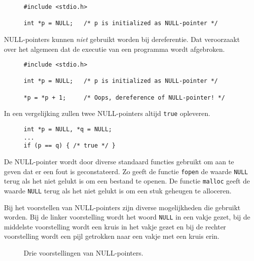 \begin{figure}[!ht]
\begin{lstlisting}[caption=Declaratie en initialisatie van een NULL-pointer.]
#include <stdio.h>

int *p = NULL;   /* p is initialized as NULL-pointer */
\end{lstlisting}
\end{figure}

NULL-pointers kunnen \textsl{niet} gebruikt worden bij dereferentie. Dat veroorzaakt over het algemeen dat de executie van een programma wordt afgebroken.

\begin{figure}[!ht]
\begin{lstlisting}[caption=Dereferentie van een NULL-pointer.]
#include <stdio.h>

int *p = NULL;   /* p is initialized as NULL-pointer */

*p = *p + 1;     /* Oops, dereference of NULL-pointer! */
\end{lstlisting}
\end{figure}

In een vergelijking zullen twee NULL-pointers altijd \texttt{true} opleveren.

\begin{figure}[H]
\begin{lstlisting}[caption=Vergelijken van twee NULL-pointers.]
int *p = NULL, *q = NULL;
...
if (p == q) { /* true */ }
\end{lstlisting}
\end{figure}

De NULL-pointer wordt door diverse standaard functies gebruikt om aan te geven dat er een fout is geconstateerd. Zo geeft de functie \texttt{fopen} de waarde \texttt{NULL} terug als het niet gelukt is om een bestand te openen. De functie \texttt{malloc} geeft de waarde \texttt{NULL} terug als het niet gelukt is om een stuk geheugen te alloceren.

Bij het voorstellen van NULL-pointers zijn diverse mogelijkheden die gebruikt worden. Bij de linker voorstelling wordt het woord \texttt{NULL} in een vakje gezet, bij de middelste voorstelling wordt een kruis in het vakje gezet en bij de rechter voorstelling wordt een pijl getrokken naar een vakje met een kruis erin.

\begin{figure}[!ht]
\centering
{}
\caption{Drie voorstellingen van NULL-pointers.}
\label{fig:poinullpointers}
\end{figure}


